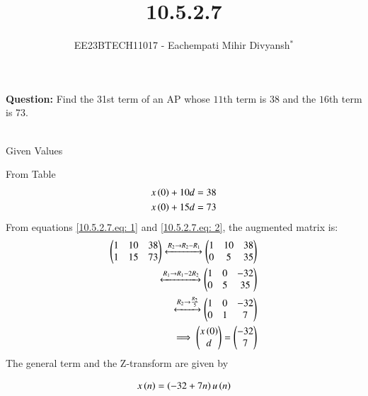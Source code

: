 \documentclass[journal,12pt,twocolumn]{IEEEtran}
\theoremstyle{remark}
\begin{document}

\vspace{3cm}

\title{10.5.2.7}
\author{EE23BTECH11017 - Eachempati Mihir Divyansh$^{*}$%
}
\maketitle
\newpage
\bigskip

\renewcommand{\thefigure}{\theenumi}
\renewcommand{\thetable}{\theenumi}

\textbf{Question:} Find the 31st term of an AP whose $11$th term is 38 and the $16$th term is 73.
\\
\solution
\\

\begin{table}[h]
    \centering
    \caption{Given Values}
    \label{tab:1}
\end{table}
From Table 
\begin{align}
x\left(0\right)+10d&=38\label{10.5.2.7.eq: 1}\\
x\left(0\right)+15d&=73 \label{10.5.2.7.eq: 2}
\end{align}
From  equations \ref{10.5.2.7.eq: 1} and \ref{10.5.2.7.eq: 2}, the augmented matrix is:
\begin{align}
 \begin{pmatrix}
   1 & 10 & 38
   \\
   1 & 15 & 73
 \end{pmatrix} 
 \xleftrightarrow[]{R_2 \rightarrow R_2-R_1} 
  \begin{pmatrix}
   1 & 10 & 38
   \\
   0 & 5 & 35
 \end{pmatrix} \\
 \xleftrightarrow[]{R_1 \rightarrow R_1-2R_2} 
  \begin{pmatrix}
   1 & 0 & -32
   \\
   0 & 5 & 35
 \end{pmatrix} \\
  \xleftrightarrow[]{R_2 \rightarrow \frac{R_2}{5}} 
  \begin{pmatrix}
   1 & 0 & -32
   \\
   0 & 1 & 7
 \end{pmatrix} \\
 \implies \begin{pmatrix}
   x\left(0\right)
   \\
   d
 \end{pmatrix}
 =
 \begin{pmatrix}
   -32
   \\
   7
 \end{pmatrix}
 \end{align}
 The general term and the Z-transform are given by

 \begin{align}
    x\left(n\right)&=\left(-32+7n\right)u\left(n\right)\\ 
 \end{align}
\end{document}
